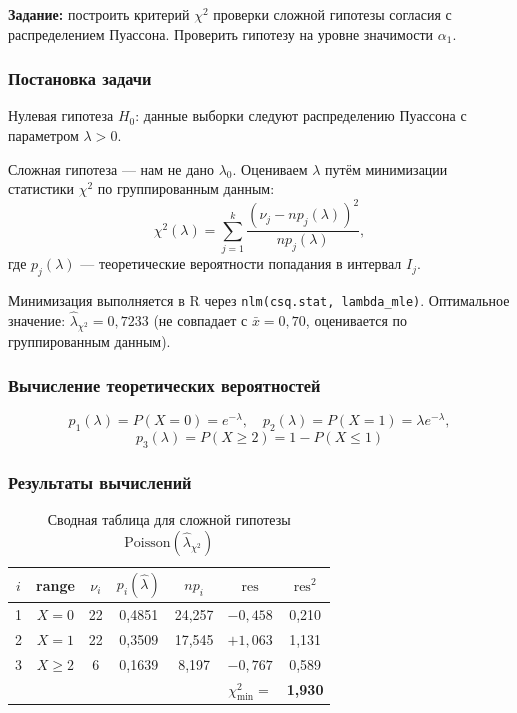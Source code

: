 \documentclass[12pt,a4paper]{article}
\begin{document}
	\textbf{Задание:} построить критерий $\chi^2$ проверки сложной гипотезы согласия
	с распределением Пуассона. Проверить гипотезу на уровне значимости $\alpha_1$.
	
	\subsubsection*{Постановка задачи}
	
	Нулевая гипотеза $H_0$: данные выборки следуют распределению Пуассона
	с параметром $\lambda > 0$.
	
	Сложная гипотеза --- нам не дано $\lambda_0$. Оцениваем $\lambda$ путём
	минимизации статистики $\chi^2$ по группированным данным:
	\[
	\chi^2(\lambda) = \sum_{j=1}^k \frac{(\nu_j - np_j(\lambda))^2}{np_j(\lambda)},
	\]
	где $p_j(\lambda)$ --- теоретические вероятности попадания в интервал $I_j$.
	
	Минимизация выполняется в R через \texttt{nlm(csq.stat, lambda\_mle)}.
	Оптимальное значение: $\hat\lambda_{\chi^2} = 0,7233$
	(не совпадает с $\bar{x} = 0,70$, оценивается по группированным данным).
	
	\subsubsection*{Вычисление теоретических вероятностей}
	
	\[
	p_1(\lambda) = P(X=0) = e^{-\lambda},\quad
	p_2(\lambda) = P(X=1) = \lambda e^{-\lambda},
	\]
	\[
	p_3(\lambda) = P(X\ge2) = 1 - P(X\le1)
	\]
	
	\subsubsection*{Результаты вычислений}
	
	\begin{table}[H]
		\centering
		\begin{tabular}{ccccccc}
			\toprule
			$i$ & range & $\nu_i$ & $p_i(\hat\lambda)$ & $np_i$ &
			$\mathrm{res}$ & $\mathrm{res}^2$ \\
			\midrule
			1 & $X=0$    & 22 & 0{,}4851 & 24{,}257 & $-0{,}458$ & 0{,}210 \\
			2 & $X=1$    & 22 & 0{,}3509 & 17{,}545 & $+1{,}063$ & 1{,}131 \\
			3 & $X\ge2$  &  6 & 0{,}1639 &  8{,}197 & $-0{,}767$ & 0{,}589 \\
			\bottomrule
			\multicolumn{6}{r}{$\chi^2_{\min} =$} & \textbf{1{,}930} \\
		\end{tabular}
		\caption{Сводная таблица для сложной гипотезы $\mathrm{Poisson}(\hat\lambda_{\chi^2})$}
	\end{table}
	
\end{document}
